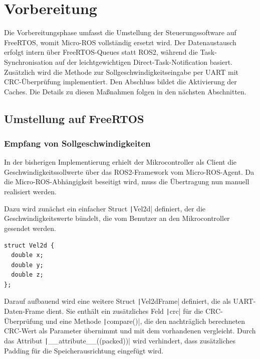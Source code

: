 \section{Vorbereitung}

Die Vorbereitungsphase umfasst die Umstellung der Steuerungssoftware auf
FreeRTOS, womit Micro-ROS vollständig ersetzt wird. Der Datenaustausch erfolgt
intern über FreeRTOS-Queues statt ROS2, während die Task-Synchronisation auf der
leichtgewichtigen Direct-Task-Notification basiert. Zusätzlich wird die Methode
zur Sollgeschwindigkeitseingabe per UART mit CRC-Überprüfung implementiert. Den
Abschluss bildet die Aktivierung der Caches. Die Details zu diesen Maßnahmen
folgen in den nächsten Abschnitten.

\subsection{Umstellung auf FreeRTOS}

\subsubsection{Empfang von Sollgeschwindigkeiten}

In der bisherigen Implementierung erhielt der Mikrocontroller als Client die
Geschwindigkeitssollwerte über das ROS2-Framework vom Micro-ROS-Agent. Da die
Micro-ROS-Abhängigkeit beseitigt wird, muss die Übertragung nun manuell
realisiert werden.

Dazu wird zunächst ein einfacher Struct \texttt|Vel2d| definiert, der
die Geschwindigkeitswerte bündelt, die vom Benutzer an den Mikrocontroller
gesendet werden.

\begin{code}
\begin{verbatim}
struct Vel2d {
  double x;
  double y;
  double z;
};
\end{verbatim}
\end{code}

Darauf aufbauend wird eine weitere Struct \texttt|Vel2dFrame|
definiert, die als UART-Daten-Frame dient. Sie enthält ein zusätzliches Feld
\texttt|crc| für die CRC-Überprüfung und eine Methode
\texttt|compare()|, die den nachträglich berechneten CRC-Wert als
Parameter übernimmt und mit dem vorhandenen vergleicht. Durch das Attribut
\linebreak\texttt|__attribute__((packed))| wird verhindert, dass
zusätzliches Padding für die Speicherausrichtung eingefügt wird.

